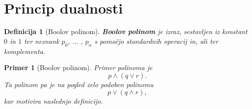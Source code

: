 \documentclass{amsart}
\newtheorem{definicija}[izrek]{Definicija}
\newtheorem{primer}[izrek]{Primer}
\begin{document}
\section{Princip dualnosti}

\begin{definicija}[Boolov polinom]
    {\bf Boolov polinom} je izraz, sestavljen iz konstant \(0\) in \(1\) ter
    neznank \(p_0\), \(\ldots\) , \(p_n\) s pomočjo standardnih operacij
    \textit{in}, \textit{ali} ter komplementa.
\end{definicija}

\begin{primer}[Boolov polinom]
    Primer polinoma je
    \[p \wedge (q \vee r).\]
    Ta polinom pa je na pogled zelo podoben polinomu
    \[p \vee (q \wedge r),\]
    kar motivira naslednjo definicijo.
\end{primer}
\end{document}
